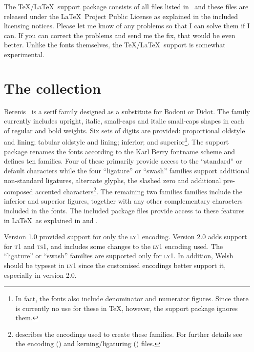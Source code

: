 \documentclass[11pt,british]{article}
\begin{document}
The \TeX/\LaTeX\ support package consists of all files listed in \ and these files are released under the \LaTeX\ Project Public License as explained in the included licensing notices. Please let me know of any problems so that I can solve them if I can. If you can correct the problems and send me the fix, that would be even better. Unlike the fonts themselves, the \TeX/\LaTeX\ support is somewhat experimental.

\section{The collection}

Berenis \adf\ is a serif family designed as a substitute for Bodoni or Didot. The family currently includes upright, italic, small-caps and italic small-caps shapes in each of regular and bold weights. Six sets of digits are provided: proportional oldstyle and lining; tabular oldstyle and lining; inferior; and superior\footnote{In fact, the fonts also include denominator and numerator figures. Since there is currently no use for these in TeX, however, the support package ignores them.}. The support package renames the fonts according to the Karl Berry fontname scheme and defines ten families. Four of these primarily provide access to the ``standard'' or default characters while the four ``ligature'' or ``swash'' families support additional non-standard ligatures, alternate glyphs, the slashed zero and additional pre-composed accented characters\footnote{ describes the encodings used to create these families. For further details see the encoding () and kerning/ligaturing () files.}. The remaining two families families include the inferior and superior figures, together with any other complementary characters included in the fonts. The included package files provide access to these features in \LaTeX\ as explained in  and .

Version 1.0 provided support for only the \textsc{ly1} encoding. Version 2.0 adds support for \textsc{t1} and \textsc{ts1}, and includes some changes to the \textsc{ly1} encoding used. The ``ligature'' or ``swash'' families are supported only for \textsc{ly1}. In addition, Welsh should be typeset in \textsc{ly1} since the customised encodings better support it, especially in version 2.0.

\end{document}
